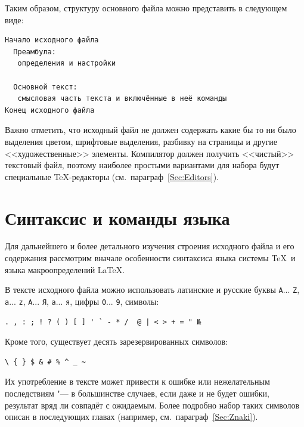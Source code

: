 Таким образом, структуру основного файла можно представить в следующем виде:
\begin{verbatim}
Начало исходного файла
  Преамбула:
   определения и настройки

  Основной текст:
   смысловая часть текста и включённые в неё команды
Конец исходного файла
\end{verbatim}

\begin{note}
Важно отметить, что исходный файл не должен содержать какие бы то ни было выделения цветом, шрифтовые выделения, разбивку на страницы и другие <<художественные>> элементы. Компилятор должен получить <<чистый>> текстовый файл, поэтому наиболее простыми вариантами для набора будут специальные \TeX-редакторы (см.\ параграф~\ref{Sec:Editors}).
\end{note}





\section{Синтаксис и команды языка}\label{Sec:Syntaxis}

Для дальнейшего и более детального изучения строения исходного файла и его содержания рассмотрим вначале особенности синтаксиса языка системы \TeX\ и языка макроопределений \LaTeX.


В тексте исходного файла можно использовать латинские и русские буквы \texttt{A}... \texttt{Z}, \texttt{a}... \texttt{z}, \texttt{А}... \texttt{Я}, \texttt{а}... \texttt{я}, цифры \texttt{0}... \texttt{9}, символы:

\begin{verbatim}
. , : ; ! ? ( ) [ ] ' ` - * /  @ | < > + = " №
\end{verbatim}
Кроме того, существует десять зарезервированных символов:
\begin{verbatim}
\ { } $ & # % ^ _ ~
\end{verbatim}
Их употребление в тексте может привести к ошибке или нежелательным последствиям "--- в большинстве случаев, если даже и не будет ошибки, результат вряд ли совпадёт с ожидаемым. Более подробно набор таких символов описан в последующих главах (например, см.\ параграф~\ref{Sec:Znaki}).

